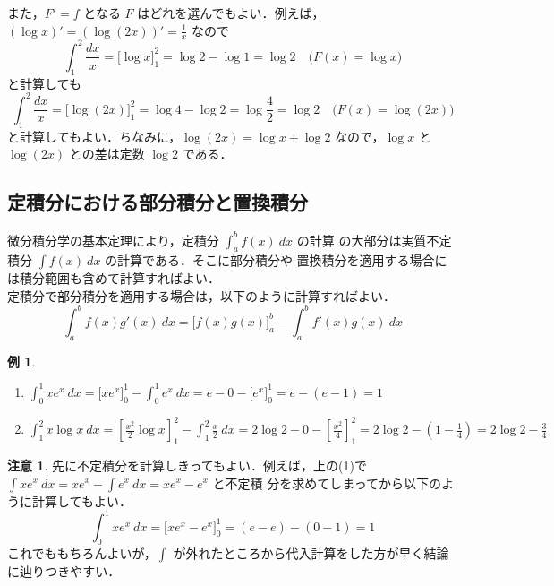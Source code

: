 \documentclass[10pt, uplatex, dvipdfmx]{jsarticle}
\theoremstyle{definition}
\newtheorem{example}[theorem]{例}
\newtheorem*{remark}{注意}
\numberwithin{equation}{section}
\newcommand{\ds}{\displaystyle}
\begin{document}
また，$F'=f$ となる $F$
はどれを選んでもよい．例えば，$\ds \left( \log x \right)' = \left(
  \log (2x) \right)' = \frac{1}{x}$ なので
\[
  \int_{1}^{2} \frac{dx}{x} = \Big[ \log x \Big]_{1}^{2} = \log 2 - \log 1 = \log 2 \quad \Big( F(x) = \log x\Big)
\]
と計算しても
\[
  \int_{1}^{2} \frac{dx}{x} = \Big[\log(2x) \Big]_{1}^{2} = \log 4 - \log 2 = \log\frac{4}{2} = \log 2 \quad
  \Big( F(x) = \log (2x) \Big)
\]
と計算してもよい．ちなみに，$\log (2x) = \log x + \log 2$ なので，$\log x$ と $\log (2x)$ との差は定数 $\log 2$ である．

\subsection{定積分における部分積分と置換積分}

微分積分学の基本定理により，定積分 $\ds \int_{a}^{b} f(x) \ dx$ の計算
の大部分は実質不定積分 $\ds \int f(x) \ dx$ の計算である．そこに部分積分や
置換積分を適用する場合には積分範囲も含めて計算すればよい．\\

定積分で部分積分を適用する場合は，以下のように計算すればよい．
\[
  \int_{a}^{b} f(x)g'(x) \ dx = \Big[ f(x) g(x) \Big]_{a}^{b} - \int_{a}^{b} f'(x) g(x) \ dx
\]

\begin{example}

  \begin{enumerate}[(1)]
    \setlength{\itemsep}{1zh}
    
  \item $\ds \int_{0}^{1} x e^x \ dx = \Big[ x e^x \Big]_{0}^{1} - \int_{0}^{1} e^x \ dx = e -0 - \Big[ e^x \Big]_{0}^{1} =
    e - \left( e-1\right) = 1$

  \item
    $\ds \int_{1}^{2} x \log x \ dx = \left[ \frac{x^2}{2} \log x
    \right]_{1}^{2} - \int_{1}^{2} \frac{x}{2} \ dx = 2 \log 2 - 0 -
    \left[ \frac{x^2}{4} \right]_{1}^{2} = 2 \log 2 - \left( 1 -
      \frac{1}{4}\right) = 2 \log 2 - \frac{3}{4}$
  \end{enumerate}
  
\end{example}

\begin{remark}
  先に不定積分を計算しきってもよい．例えば，上の(1)で
  $\ds \int x e^x \ dx = x e^x - \int e^x \ dx = x e^x - e^x$ と不定積
  分を求めてしまってから以下のように計算してもよい．
  \[
    \int_{0}^{1} x e^x \ dx = \Big[ x e^x - e^x\Big]_{0}^{1} = (e-e) - (0 - 1) = 1
  \]
  これでももちろんよいが，$\ds \int$ が外れたところから代入計算をした方が早く結論に辿りつきやすい．\\
\end{remark}
\end{document}
